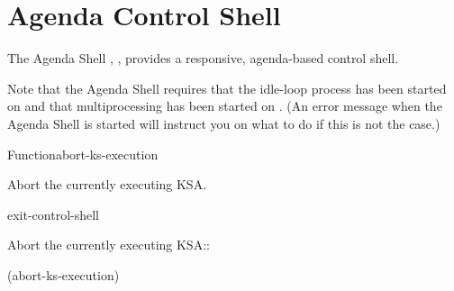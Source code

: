 \documentclass[10pt,twoside,english,pdftex]{article}
\begin{document}
\T\markright{}%
\T\pagestyle{plain}
\T\cleardoublepage
\W{}
\T\pagestyle{fancy}
\T\thispagestyle{fancybottom}
\T\global\def\fnlastname{ }%
\T\renewcommand{\headrulewidth}{0pt}
\section{Agenda Control Shell}

%
%
%
The Agenda Shell , , provides a responsive,
agenda-based control shell.

Note that the Agenda Shell requires that the idle-loop process has been
started on  and that
multiprocessing has been started on
.  (An error message when the
Agenda Shell is started will instruct you on what to do if this is not the
case.)

\W\entities
\T\clearpage
\T\renewcommand{\headrulewidth}{0.01pt}


\begin{functiondoc}{Function}{abort-ks-execution}{\noargs}
%

\fnsyntax

\fnpurpose Abort the currently executing KSA.

\fnpackage {}

\fnmodule {}

\begin{alsos}{exit-control-shell}
\end{alsos}

\fnexample
Abort the currently executing KSA::
%
\W\supp
\begin{example}
  (abort-ks-execution)
\end{example}

\end{functiondoc}

\end{document}
